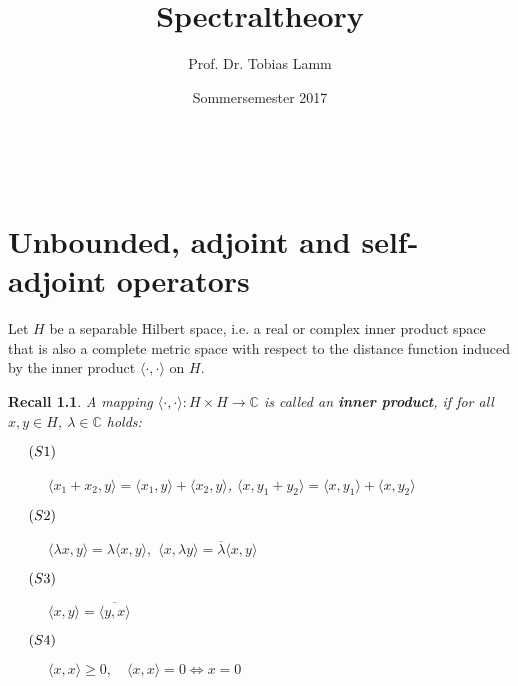 \documentclass[12pt]{extreport} %
\title{Spectraltheory}
\author{Prof. Dr. Tobias Lamm}
\date{Sommersemester 2017}
\makeatletter
\newcommand{\C}{\mathbb{C}}
\theoremstyle{named}
\theoremstyle{nnamed}
\theoremstyle{itshape}
\theoremstyle{normal}
\newtheorem*{recall}{Recall}
\def\maketitle{ \begin{titlepage} 
			~\vspace{3cm} 
		\begin{center} {\Huge \@title} \end{center} 
	 		\vspace*{1cm} 
	 	\begin{center} {\large \@author} \end{center} 
	 	\vspace*{-0.5cm}
	 	\begin{center} \@date \end{center} 
	 		\vspace*{7cm} 
	 	\begin{center} \@publishers \end{center} 
	 		\vfill 
	\end{titlepage} }
\makeatother
\begin{document}
\begin{titlepage}
	\maketitle
	\thispagestyle{empty}
\end{titlepage}

\tableofcontents
\thispagestyle{empty}


\chapter{Unbounded, adjoint and self-adjoint operators}


Let $H$ be a separable Hilbert space, i.e. a real or complex inner product space that is also a complete metric space with respect to the distance function induced by the inner product $\langle \cdot, \cdot \rangle$ on $H$. ~\bigskip

\begin{recall} 
	A mapping $\langle \cdot, \cdot \rangle \colon H \times H \rightarrow \C$
	is called an \textbf{inner product}, if for all $x, y \in H$, $\lambda \in \C$ holds:
	\begin{description}
	 	\item[$\hspace{0.5cm} (S1) \hspace{0.1cm} $] $\langle x_{1} + x_{2}, y \rangle = \langle x_{1}, y \rangle + \langle x_{2}, y \rangle$, $\langle x, y_{1} + y_{2} \rangle = \langle x, y_{1} \rangle + \langle x, y_{2} \rangle$
	 	\item[$\hspace{0.5cm} (S2) \hspace{0.1cm} $] $\langle  \lambda x, y \rangle = \lambda \langle x, y \rangle,$ $\langle x, \lambda y \rangle = \overline{\lambda} \langle x, y \rangle$
	 	\item[$\hspace{0.5cm} (S3) \hspace{0.1cm} $] $\langle  x, y \rangle = \overline{\langle y, x \rangle }$
	 	\item[$\hspace{0.5cm} (S4) \hspace{0.1cm} $] $\langle  x, x \rangle \geq 0, \quad \langle x, x \rangle = 0 \iff x = 0$
	\end{description}	
\end{recall} ~\smallskip
\end{document}
